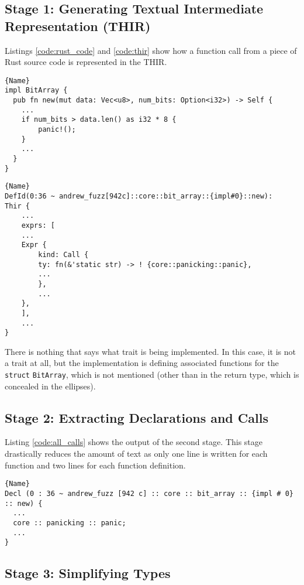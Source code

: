 \documentclass[11pt]{article}
\begin{document}
\subsection{Stage 1: Generating Textual Intermediate Representation (THIR)}

Listings \ref{code:rust_code} and \ref{code:thir} show how a function call from a piece of Rust source code is represented in the THIR.

\begin{lstlisting}[caption=Rust Code, label=code:rust_code]{Name}
impl BitArray {
  pub fn new(mut data: Vec<u8>, num_bits: Option<i32>) -> Self {
    ...
    if num_bits > data.len() as i32 * 8 {
        panic!();
    }
    ...
  }
}
\end{lstlisting}

\begin{lstlisting}[caption=THIR-flat, label=code:thir]{Name}
DefId(0:36 ~ andrew_fuzz[942c]::core::bit_array::{impl#0}::new):
Thir {
    ...
    exprs: [
    ...
    Expr {
        kind: Call {
        ty: fn(&'static str) -> ! {core::panicking::panic},
        ...
        },
        ...
    },
    ],
    ...
}
\end{lstlisting}

There is nothing that says what trait is being implemented.
In this case, it is not a trait at all, but the implementation is defining associated functions for the \lstinline{struct} \lstinline{BitArray}, which is not mentioned (other than in the return type, which is concealed in the ellipses).

\subsection{Stage 2: Extracting Declarations and Calls}

Listing \ref{code:all_calls} shows the output of the second stage.
This stage drastically reduces the amount of text as only one line is written for each function and two lines for each function definition.

\begin{lstlisting}[caption=Extracted Calls, label=code:all_calls]{Name}
Decl (0 : 36 ~ andrew_fuzz [942 c] :: core :: bit_array :: {impl # 0} :: new) {
  ...
  core :: panicking :: panic;
  ...
}
\end{lstlisting}

\subsection{Stage 3: Simplifying Types}
\end{document}
